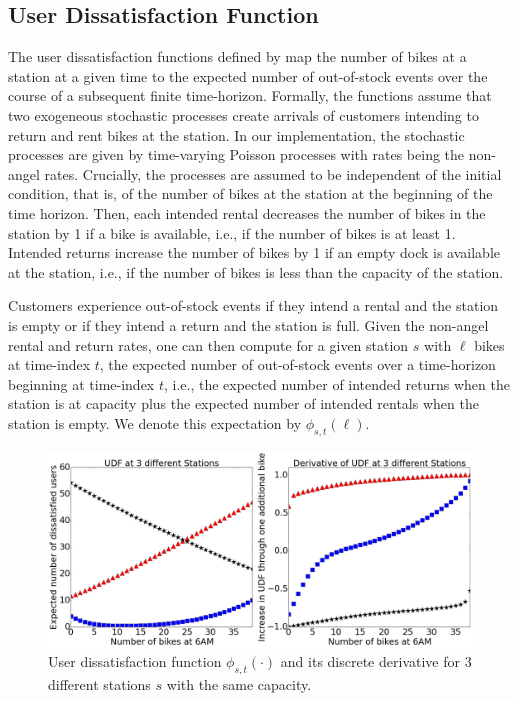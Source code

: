 \subsection{User Dissatisfaction Function}\label{ssec:udf}
The user dissatisfaction functions defined by \cite{raviv2013optimal} map the number of bikes at a station at a given time to the expected number of out-of-stock events over the course of a subsequent finite time-horizon. Formally, the functions assume that two exogeneous stochastic processes create arrivals of customers intending to return and rent bikes at the station. In our implementation, the stochastic processes are given by time-varying Poisson processes with rates being the non-angel rates. Crucially, the processes are assumed to be independent of the initial condition, that is, of the number of bikes at the station at the beginning of the time horizon. Then, each intended rental decreases the number of bikes in the station by 1 if a bike is available, i.e., if the number of bikes is at least 1. Intended returns increase the number of bikes by 1 if an empty dock is available at the station, i.e., if the number of bikes is less than the capacity of the station.  

Customers experience out-of-stock events if they intend a rental and the station is empty or if they intend a return and the station is full. Given the non-angel rental and return rates, one can then compute for a given station $s$ with $\ell$ bikes at time-index $t$, the expected number of out-of-stock events over a time-horizon beginning at time-index $t$, i.e., the expected number of intended returns  when the station is at capacity plus the expected number of intended rentals when the station is empty. We denote this expectation by $\phi_{s, t} (\ell)$.



\begin{figure}
\centering
\includegraphics[width=.5\textwidth]{../Plots/UDFandDerivative2.png}
\caption{User dissatisfaction function $\phi_{s,t}(\cdot)$ and its discrete derivative for 3 different stations $s$ with the same capacity.}
\label{fig:UDFandDerivative}
\end{figure}

